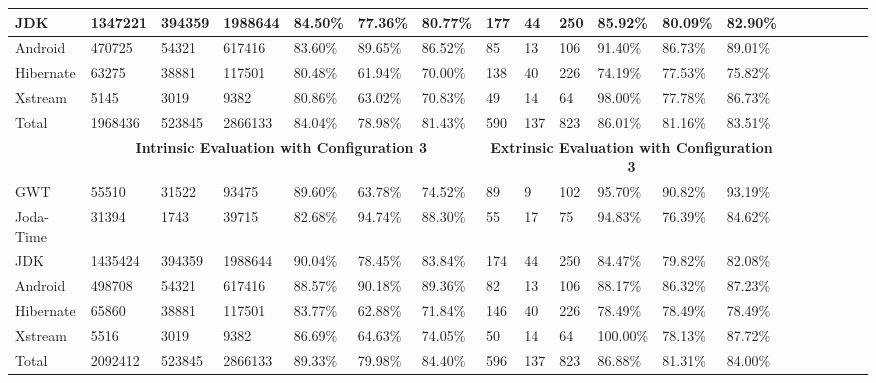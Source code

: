 \begin{table}[t]
\begin{tabular}{|l|l|l|l|l|l|l|l|l|l|l|l|l|l|l|l|l|l|l|}
\hline
JDK       & 1347221                                    & 394359 & 1988644 & 84.50\%   & 77.36\% & 80.77\%  & 177            & 44    & 250   & 85.92\%   & 80.09\% & 82.90\%  \\
\hline
Android   & 470725                                    & 54321  & 617416  & 83.60\%   & 89.65\% & 86.52\% & 85             & 13    & 106   & 91.40\%   & 86.73\% & 89.01\%  \\
\hline
Hibernate & 63275                                     & 38881  & 117501  & 80.48\%   & 61.94\% & 70.00\% & 138            & 40    & 226   & 74.19\%   & 77.53\% & 75.82\%  \\
\hline
Xstream   & 5145                                      & 3019   & 9382    & 80.86\%   & 63.02\% & 70.83\% & 49             & 14    & 64    & 98.00\%   & 77.78\% & 86.73\%  \\
\hline
Total     & 1968436                                   & 523845 & 2866133 & 84.04\%   & 78.98\% & 81.43\%   & 590           & 137   & 823   & 86.01\%   & 81.16\% & 83.51\%     \\
\hline
          & \multicolumn{6}{c|}{\textbf{Intrinsic Evaluation with Configuration 3}}      & \multicolumn{6}{c|}{\textbf{Extrinsic Evaluation with Configuration 3}}            \\
\hline
GWT       & 55510                                     & 31522  & 93475   & 89.60\%   & 63.78\% & 74.52\%    & 89              & 9     & 102   & 95.70\%   & 90.82\% & 93.19\%  \\
\hline
Joda-Time & 31394                                     & 1743   & 39715   & 82.68\%   & 94.74\% & 88.30\%  & 55             & 17    & 75    & 94.83\%   & 76.39\% & 84.62\%  \\
\hline
JDK       & 1435424                                    & 394359 & 1988644 & 90.04\%   & 78.45\% & 83.84\%  & 174            & 44    & 250   & 84.47\%   & 79.82\% & 82.08\%  \\
\hline
Android   & 498708                                    & 54321  & 617416  & 88.57\%   & 90.18\% & 89.36\% & 82             & 13    & 106   & 88.17\%   & 86.32\% & 87.23\%  \\
\hline
Hibernate & 65860                                     & 38881  & 117501  & 83.77\%   & 62.88\% & 71.84\% & 146            & 40    & 226   & 78.49\%   & 78.49\% & 78.49\%  \\
\hline
Xstream   & 5516                                      & 3019   & 9382    & 86.69\%   & 64.63\% & 74.05\% & 50             & 14    & 64    & 100.00\%  & 78.13\% & 87.72\%  \\
\hline
Total     & 2092412                                   & 523845 & 2866133 & 89.33\%   & 79.98\% & 84.40\%   & 596           & 137   & 823   & 86.88\%   & 81.31\% & 84.00\%   \\
\hline
\end{tabular}

\label{tbl:IntrinsicAndExtrinsic}
\end{table}


